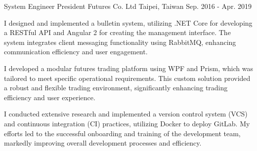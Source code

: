\begin{cventries}
\cventry
{System Engineer} %
{President Futures Co. Ltd} %
{Taipei, Taiwan} %
{Sep. 2016 - Apr. 2019} %
{
  \begin{cvitems} %
    \item {I designed and implemented a bulletin system, utilizing .NET Core for developing a RESTful API and Angular 2 for creating the management interface. The system integrates client messaging functionality using RabbitMQ, enhancing communication efficiency and user engagement.}
    \item {I developed a modular futures trading platform using WPF and Prism, which was tailored to meet specific operational requirements. This custom solution provided a robust and flexible trading environment, significantly enhancing trading efficiency and user experience.}
    \item {I conducted extensive research and implemented a version control system (VCS) and continuous integration (CI) practices, utilizing Docker to deploy GitLab. My efforts led to the successful onboarding and training of the development team, markedly improving overall development processes and efficiency.}
  \end{cvitems}
}

\end{cventries}
